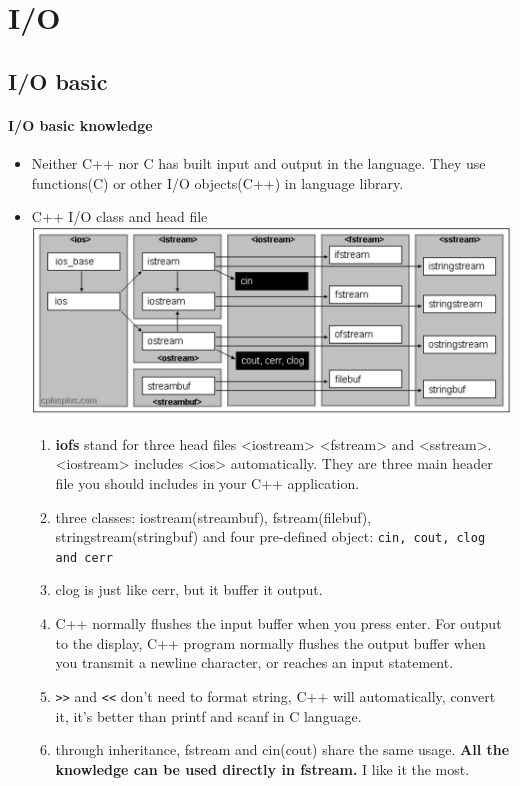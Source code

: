 \documentclass[a4paper,12pt,twoside]{book}
\begin{document}
\chapter{I/O}
\section{I/O basic}
\subsubsection{I/O basic knowledge}
\begin{itemize}
	\item Neither C++ nor C has built input and output in the language. They use functions(C) or other I/O objects(C++) in language library.
	
	\item C++ I/O class and head file \\
	\includegraphics[scale=0.45]{pics/io.png}
	\begin{enumerate}

		\item \textbf{iofs} stand for three head files <iostream> <fstream> and <sstream>. <iostream> includes <ios> automatically. They are three main header file you should includes in your C++ application.
		
		\item three classes: iostream(streambuf), fstream(filebuf), stringstream(stringbuf) and four pre-defined object: \texttt{cin, cout, clog and cerr} 
		
		\item clog is just like cerr, but it buffer it output.
		
		\item C++ normally flushes the input buffer when you press enter. For output to the display, C++ program normally flushes the output buffer when you transmit a newline character, or reaches an input statement.
		
		\item \verb=>>= and \verb=<<= don't need to format string,  C++ will automatically,  convert it, it's better than printf and scanf in C language.
		
		\item through inheritance, fstream and cin(cout) share the same usage. \textbf{All the knowledge can be used directly in fstream.} I like it the most.
	\end{enumerate}
	
\end{itemize}
\end{document}
